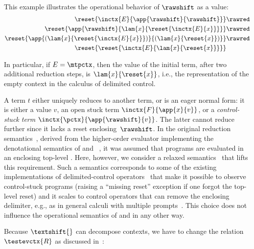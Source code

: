 \documentclass{lmcs}
\theoremstyle{defC}
\begin{document}
\begin{exa}
  This example illustrates the operational behavior of $\rawshift$ as a value:
  \vspace{1mm}
  \begin{align*}
    \reset{\inctx{E}{\app{\rawshift}{\rawshift}}} & \rawred \\
    \reset{\app{\rawshift}{\lam{x}{\reset{\inctx{E}{x}}}}} & \rawred \\
    \reset{\app{(\lam{x}{\reset{\inctx{E}{x}}})}{(\lam{x}{\reset{x}})}} & \rawred \\
    \reset{\reset{\inctx{E}{\lam{x}{\reset{x}}}}} &
  \end{align*}

  \vspace{2mm}\noindent In particular, if $E = \mtpctx$, then the value of the
  initial term, after two additional reduction steps, is $\lam{x}{\reset{x}}$,
  i.e., the representation of the empty context in the calculus of delimited
  control.
\end{exa}

A term $t$ either uniquely reduces to another term, or is an eager normal form:
it is either a value $v$, an open stuck term $\inctx{F}{\app{x}{v}}$, or a \textit{
  control-stuck term} $\inctx{\pctx}{\app{\rawshift}{v}}$. The latter cannot
reduce further since it lacks a reset enclosing~$\rawshift$. In the original
reduction semantics~\cite{Biernacka-al:LMCS05}, derived from the higher-order
evaluator implementing the denotational semantics of \textshift and
\textreset~\cite{Danvy-Filinski:LFP90}, it was assumed that programs are
evaluated in an enclosing top-level \textreset{}. Here, however, we consider a
relaxed semantics~\cite{Biernacki-al:HAL15} that lifts this requirement. Such a
semantics corresponds to some of the existing implementations of
delimited-control operators~\cite{Filinski:POPL94} that make it possible to
observe control-stuck programs (raising a ``missing reset'' exception if one
forgot the top-level reset) and it scales to control operators that can remove
the enclosing delimiter, e.g., as in general calculi with multiple
prompts~\cite{Dybvig-al:JFP06,Aristizabal-al:LMCS17}. This choice does not
influence the operational semantics of \textshift and \textreset in any other
way.

Because $\textshift{}$ can decompose contexts, we have to change the relation
$\testevctx{R}$ as discussed in~\cite{Biernacki-al:HAL15}:
\end{document}
